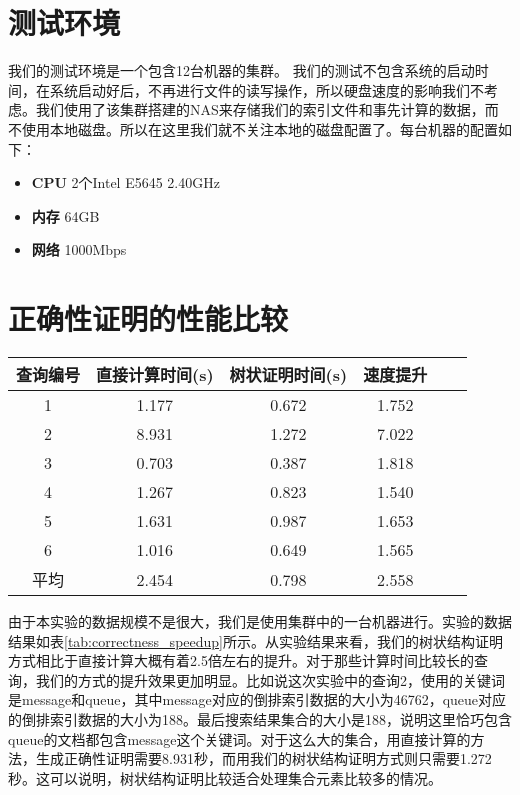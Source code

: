 \section {测试环境}

我们的测试环境是一个包含12台机器的集群。
我们的测试不包含系统的启动时间，在系统启动好后，不再进行文件的读写操作，所以硬盘速度的影响我们不考虑。我们使用了该集群搭建的NAS来存储我们的索引文件和事先计算的数据，而不使用本地磁盘。所以在这里我们就不关注本地的磁盘配置了。每台机器的配置如下：

\begin{itemize}
    \item \textbf{CPU} 2个Intel E5645 2.40GHz
    \item \textbf{内存} 64GB
    \item \textbf{网络} 1000Mbps
\end{itemize}

\section {正确性证明的性能比较}
\begin{table}[htb]
    \centering
    \begin{tabular}{cccccc}
        \toprule
        查询编号 & 直接计算时间(s) & 树状证明时间(s) & 速度提升 \\
        \midrule
        1 & 1.177 & 0.672 & 1.752  \\
        2 & 8.931 & 1.272 & 7.022  \\
        3 & 0.703 & 0.387 & 1.818  \\
        4 & 1.267 & 0.823 & 1.540  \\
        5 & 1.631 & 0.987 & 1.653  \\
        6 & 1.016 & 0.649 & 1.565  \\
        \midrule
        平均 & 2.454 & 0.798 & 2.558  \\
        \bottomrule
    \end{tabular}
\end{table}

由于本实验的数据规模不是很大，我们是使用集群中的一台机器进行。实验的数据结果如表\ref{tab:correctness_speedup}所示。从实验结果来看，我们的树状结构证明方式相比于直接计算大概有着2.5倍左右的提升。对于那些计算时间比较长的查询，我们的方式的提升效果更加明显。比如说这次实验中的查询2，使用的关键词是message和queue，其中message对应的倒排索引数据的大小为46762，queue对应的倒排索引数据的大小为188。最后搜索结果集合的大小是188，说明这里恰巧包含queue的文档都包含message这个关键词。对于这么大的集合，用直接计算的方法，生成正确性证明需要8.931秒，而用我们的树状结构证明方式则只需要1.272秒。这可以说明，树状结构证明比较适合处理集合元素比较多的情况。

